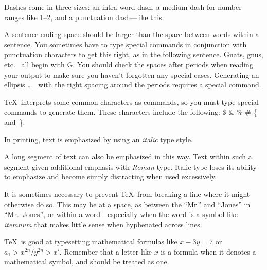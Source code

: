 \documentclass{kluwer}    %
\begin{document}
\begin{article}
Dashes come in three sizes: an 
       intra-word 
dash, a medium dash for number ranges like 
       1--2, 
and a punctuation 
       dash---like 
this.

A sentence-ending space should be larger than the space between words
within a sentence.  You sometimes have to type special commands in
conjunction with punctuation characters to get this right, as in the
following sentence.
       Gnats, gnus, etc.\    %
       all begin with G\@.   %
You should check the spaces after periods when reading your output to
make sure you haven't forgotten any special cases.
Generating an ellipsis 
       \ldots\    %
with the right spacing around the periods 
requires a special  command.  

\TeX\ interprets some common characters as commands, so you must type
special commands to generate them.  These characters include the
following: 
       \$ \& \% \# \{ and~\}.

In printing, text is emphasized by using an
       {\em italic\/}  %
type style.  

\begin{em}
   A long segment of text can also be emphasized in this way.  Text within
   such a segment given additional emphasis 
      with\/ {\em Roman} 
   type.  Italic type loses its ability to emphasize and become simply
   distracting when used excessively.  
\end{em}

It is sometimes necessary to prevent \TeX\ from breaking a line where
it might otherwise do so.  This may be at a space, as between the
``Mr.'' and ``Jones'' in
       ``Mr.~Jones'',        %
or within a word---especially when the word is a symbol like
       \mbox{\em itemnum\/} 
that makes little sense when hyphenated across 
       lines.





\TeX\ is good at typesetting mathematical formulas like
       \( x-3y = 7 \) 
or
       \( a_{1} > x^{2n} / y^{2n} > x' \).
Remember that a letter like
       $x$        %
is a formula when it denotes a mathematical symbol, and should
be treated as one.



\end{article}
\end{document}
